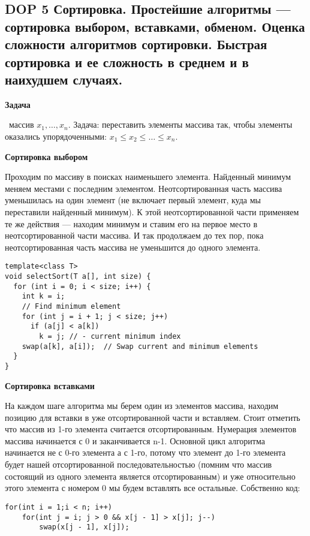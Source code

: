 \subsection{DOP 5 Сортировка.  Простейшие  алгоритмы --- сортировка  выбором,  вставками,  обменом.  Оценка  сложности алгоритмов сортировки. Быстрая сортировка и ее сложность в среднем и в наихудшем случаях.}

\textbf{Задача}

\faEye \ массив $x_1, \dots, x_n$.
Задача: переставить элементы массива так, чтобы элементы оказались упорядоченными: $x_1 \leqslant x_2 \leqslant \dots \leqslant x_n$.

\textbf{Сортировка выбором}

Проходим по массиву в поисках наименьшего элемента. Найденный минимум меняем местами с последним элементом. Неотсортированная часть массива уменьшилась на один элемент (не включает первый элемент, куда мы переставили найденный минимум). К этой неотсортированной части применяем те же действия — находим минимум и ставим его на первое место в неотсортированной части массива. И так продолжаем до тех пор, пока неотсортированная часть массива не уменьшится до одного элемента.

\begin{verbatim}
template<class T> 
void selectSort(T a[], int size) {
  for (int i = 0; i < size; i++) {
    int k = i;
    // Find minimum element
    for (int j = i + 1; j < size; j++)
      if (a[j] < a[k])
        k = j; // - current minimum index
    swap(a[k], a[i]);  // Swap current and minimum elements
  }
}
\end{verbatim}

\textbf{Сортировка вставками}

На каждом шаге алгоритма мы берем один из элементов массива, находим позицию для вставки в уже отсортированной части и вставляем. Стоит отметить что массив из 1-го элемента считается отсортированным.
Нумерация элементов массива начинается с 0 и заканчивается n-1.
Основной цикл алгоритма начинается не с 0-го элемента а с 1-го, потому что элемент до 1-го элемента будет нашей отсортированной последовательностью (помним что массив состоящий из одного элемента является отсортированным) и уже относительно этого элемента с номером 0 мы будем вставлять все остальные. Собственно код:

\begin{verbatim}
for(int i = 1;i < n; i++)         
    for(int j = i; j > 0 && x[j - 1] > x[j]; j--) 
	    swap(x[j - 1], x[j]);
\end{verbatim}


